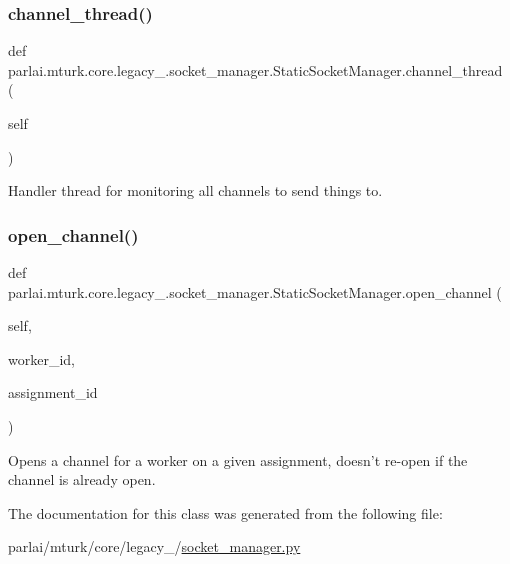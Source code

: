 \subsubsection{\texorpdfstring{channel\+\_\+thread()}{channel\_thread()}}
{\footnotesize\ttfamily def parlai.\+mturk.\+core.\+legacy\+\_.\+socket\+\_\+manager.\+Static\+Socket\+Manager.\+channel\+\_\+thread (\begin{DoxyParamCaption}\item[{}]{self }\end{DoxyParamCaption})}

\begin{DoxyVerb}Handler thread for monitoring all channels to send things to.
\end{DoxyVerb}
 \mbox{\label{classparlai_1_1mturk_1_1core_1_1legacy__2018_1_1socket__manager_1_1StaticSocketManager_ac5de566ae19796033224e18fdd86e5b9}} 
\subsubsection{\texorpdfstring{open\+\_\+channel()}{open\_channel()}}
{\footnotesize\ttfamily def parlai.\+mturk.\+core.\+legacy\+\_.\+socket\+\_\+manager.\+Static\+Socket\+Manager.\+open\+\_\+channel (\begin{DoxyParamCaption}\item[{}]{self,  }\item[{}]{worker\+\_\+id,  }\item[{}]{assignment\+\_\+id }\end{DoxyParamCaption})}

\begin{DoxyVerb}Opens a channel for a worker on a given assignment, doesn't re-open if the
channel is already open.
\end{DoxyVerb}
 

The documentation for this class was generated from the following file\+:\begin{DoxyCompactItemize}
\item 
parlai/mturk/core/legacy\+\_/\hyperlink{legacy__2018_2socket__manager_8py}{socket\+\_\+manager.\+py}\end{DoxyCompactItemize}
